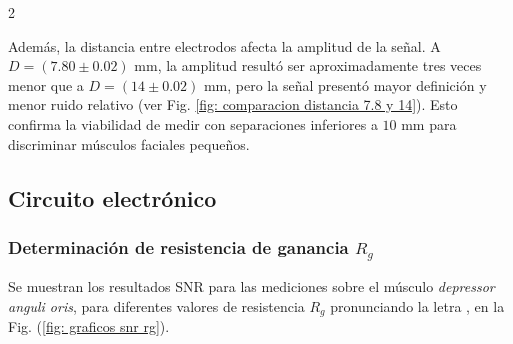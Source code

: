 \documentclass[11pt,letterpaper]{article}
\begin{document}
\begin{multicols*}{2}


Además, la distancia entre electrodos afecta la amplitud de la señal. A $D= (7.80 \pm 0.02)$ mm, la amplitud resultó ser aproximadamente tres veces menor que a $D = (14\pm0.02)$ mm, pero la señal presentó mayor definición y menor ruido relativo (ver Fig. \ref{fig: comparacion distancia 7.8 y 14}). Esto confirma la viabilidad de medir con separaciones inferiores a $10$ mm para discriminar músculos faciales pequeños.

\subsection{Circuito electrónico}

\subsubsection{Determinación de resistencia de ganancia $R_g$}

Se muestran los resultados SNR para las mediciones sobre el músculo \textit{depressor anguli oris}, para diferentes valores de resistencia $R_g$ pronunciando la letra , en la Fig. (\ref{fig: graficos snr rg}).


\end{multicols*}
\end{document}
